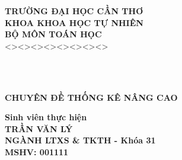 \documentclass[a4paper,oneside]{thesis}
\newlength{\defbaselineskip}
\newcommand{\setlinespacing}[1]%
           {\setlength{\baselineskip}{#1 \defbaselineskip}}
\begin{document}
\newpage


\begin{titlepage}

\hspace{2.8cm} {\bf \fontsize{16pt}{16}\selectfont TRƯỜNG ĐẠI HỌC CẦN THƠ}\\
\vspace*{0.05cm}
\hspace{3.3cm} {\bf\fontsize{16pt}{16}\selectfont KHOA KHOA HỌC TỰ NHIÊN}\\
 \vspace*{0.05cm}
\hspace{4.3cm} {\bf\fontsize{16pt}{16}\selectfont BỘ MÔN TOÁN HỌC}\\
\vspace*{0.05cm}
\hspace{5 cm} <><><><><><><><> 


\vspace*{2cm}

\\
 \vspace*{0.05cm}\\
\vspace*{2cm}

\begin{center}
 {\bf\fontsize{20pt}{28}\selectfont CHUYÊN ĐỀ THỐNG KÊ NÂNG CAO }   
\end{center}




\vspace*{1.5cm}

\begin{center}
\textbf{Sinh viên thực hiện}\\    
\textbf{TRẦN VĂN LÝ}\\
\textbf{NGÀNH LTXS \& TKTH - Khóa 31}\\
\textbf{MSHV: 001111}
\end{center}



\vspace*{3cm}
\end{titlepage}

\setlinespacing{1.2}

\tableofcontents %
\newpage
{}
\listoffigures %
\end{document}
